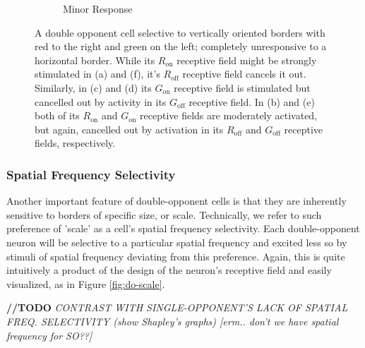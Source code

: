 \documentclass[journal,onecolumn]{IEEEtran}
\begin{document}
\begin{figure}[h]
\begin{subfigure}{0.3\textwidth}
        \caption{Minor Response}
    \end{subfigure}
    \caption{A double opponent cell selective to vertically oriented borders with red to the right and green on the left; completely unresponsive to a horizontal border. While its $R_{\text{on}}$ receptive field might be strongly stimulated in (a) and (f), it's $R_{\text{off}}$ receptive field cancels it out. Similarly, in (c) and (d) its $G_{\text{on}}$ receptive field is stimulated but cancelled out by activity in its $G_{\text{off}}$ receptive field. In (b) and (e) both of its $R_{\text{on}}$ and $G_{\text{on}}$ receptive fields are moderately activated, but again, cancelled out by activation in its $R_{\text{off}}$ and $G_{\text{off}}$ receptive fields, respectively.}
\end{figure}


\subsubsection*{Spatial Frequency Selectivity}

Another important feature of double-opponent cells is that they are inherently sensitive to borders of specific size, or scale. Technically, we refer to such preference of 'scale' as a cell's spatial frequency selectivity. Each double-opponent neuron will be selective to a particular spatial frequency and excited less so by stimuli of spatial frequency deviating from this preference. Again, this is quite intuitively a product of the design of the neuron's receptive field and easily visualized, as in Figure \ref{fig:do-scale}.

\textbf{//TODO} \textit{CONTRAST WITH SINGLE-OPPONENT'S LACK OF SPATIAL FREQ. SELECTIVITY (show Shapley's graphs) [erm.. don't we have spatial frequency for SO??]}
\end{document}
